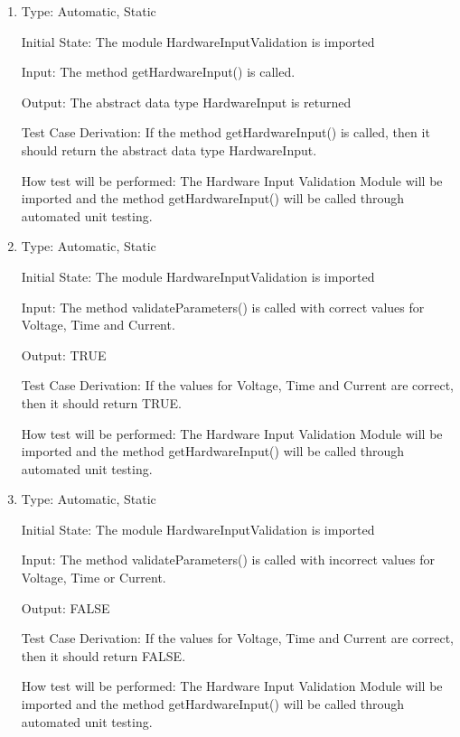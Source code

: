 \documentclass[12pt, titlepage]{article}
\begin{document}
\begin{enumerate}[{UT-HI}1.]
  \item
  
  Type: Automatic, Static 

  Initial State: The module HardwareInputValidation is imported

  Input: The method getHardwareInput() is called.

  Output: The abstract data type HardwareInput is returned 

  Test Case Derivation: If the method getHardwareInput() is called, then it should return the abstract data type HardwareInput.

  How test will be performed: The Hardware Input Validation Module will be imported and the method getHardwareInput() will be called through automated unit testing. 

  \item
  
  Type: Automatic, Static 

  Initial State: The module HardwareInputValidation is imported

  Input: The method validateParameters() is called with correct values for Voltage, Time and Current.

  Output: TRUE

  Test Case Derivation: If the values for Voltage, Time and Current are correct, then it should return TRUE.

  How test will be performed: The Hardware Input Validation Module will be imported and the method getHardwareInput() will be called through automated unit testing.

  \item
  
  Type: Automatic, Static 

  Initial State: The module HardwareInputValidation is imported

  Input: The method validateParameters() is called with incorrect values for Voltage, Time or Current.

  Output: FALSE

  Test Case Derivation: If the values for Voltage, Time and Current are correct, then it should return FALSE.

  How test will be performed: The Hardware Input Validation Module will be imported and the method getHardwareInput() will be called through automated unit testing.

\end{enumerate}
\end{document}
